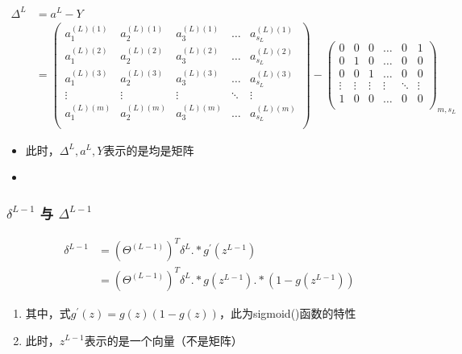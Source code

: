 \begin{equation}\begin{aligned}
	\Delta^{L} &= a^{L} - Y \\
	&= 	
		\left(\begin{matrix}
			a_1^{(L)(1)} & a_2^{(L)(1)} & a_3^{(L)(1)} & \dots & a_{s_L}^{(L)(1)} \\
			a_1^{(L)(2)} & a_2^{(L)(2)} & a_3^{(L)(2)} & \dots & a_{s_L}^{(L)(2)} \\
			a_1^{(L)(3)} & a_2^{(L)(3)} & a_3^{(L)(3)} & \dots & a_{s_L}^{(L)(3)} \\
			\vdots & \vdots & \vdots & \ddots & \vdots \\
			a_1^{(L)(m)} & a_2^{(L)(m)} & a_3^{(L)(m)} & \dots & a_{s_L}^{(L)(m)} \\
		\end{matrix}\right) - 
		 \left(\begin{matrix}
	        0 & 0 & 0 & \dots & 0 & 1 \\
	        0 & 1 & 0 & \dots & 0 & 0 \\
	        0 & 0 & 1 & \dots & 0 & 0 \\
	        \vdots & \vdots & \vdots & \vdots & \ddots & \vdots \\
	        1 & 0 & 0 & \dots & 0 & 0 \\
		\end{matrix}\right)_{m,s_L}
\end{aligned}\end{equation}
\begin{itemize}
	\item 此时，$\Delta^{L}, a^{L}, Y$表示的是均是矩阵
	\item {}
\end{itemize}

\subsubsection{$\delta^{L-1}$ 与 $\Delta^{L-1}$}
\begin{equation}\begin{aligned}
	\delta^{L-1} &= (\Theta^{(L-1)})^T \delta^{L} .* g^{'}(z^{L-1}) \\
	&= (\Theta^{(L-1)})^T \delta^{L} .* g(z^{L-1}) .* (1-g(z^{L-1}))
\end{aligned}\end{equation}
\begin{enumerate}
	\item 其中，式$g^{'}(z) = g(z)(1-g(z))$，此为sigmoid()函数的特性
	\item 此时，$z^{L-1}$表示的是一个向量（不是矩阵）
\end{enumerate}

